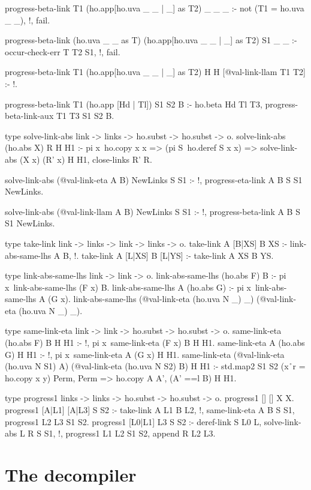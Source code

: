 \begin{elpicode}
  progress-beta-link T1 (ho.app[ho.uva _ _ | _] as T2) _ _ _ :- 
    not (T1 = ho.uva _ _), !, fail.

  progress-beta-link (ho.uva _ _ as T) (ho.app[ho.uva _ _ | _] as T2) S1 _ _ :- 
    occur-check-err T T2 S1, !, fail.

  progress-beta-link T1 (ho.app[ho.uva _ _ | _] as T2) H H [@val-link-llam T1 T2] :- !.

  progress-beta-link T1 (ho.app [Hd | Tl]) S1 S2 B :-
    ho.beta Hd Tl T3, 
    progress-beta-link-aux T1 T3 S1 S2 B.

  type solve-link-abs link -> links -> ho.subst -> ho.subst -> o.
  solve-link-abs (ho.abs X) R H H1 :- 
    pi x\ ho.copy x x => (pi S\ ho.deref S x x) => 
      solve-link-abs (X x) (R' x) H H1,
    close-links R' R.

  solve-link-abs (@val-link-eta A B) NewLinks S S1 :- !,
    progress-eta-link A B S S1 NewLinks.

  solve-link-abs (@val-link-llam A B) NewLinks S S1 :- !,
    progress-beta-link A B S S1 NewLinks.

  type take-link link -> links -> link -> links -> o.
  take-link A [B|XS] B XS :- link-abs-same-lhs A B, !.
  take-link A [L|XS] B [L|YS] :- take-link A XS B YS.

  type link-abs-same-lhs link -> link -> o.
  link-abs-same-lhs (ho.abs F) B :- 
    pi x\ link-abs-same-lhs (F x) B.
  link-abs-same-lhs A (ho.abs G) :- 
    pi x\ link-abs-same-lhs A (G x).
  link-abs-same-lhs (@val-link-eta (ho.uva N _) _) (@val-link-eta (ho.uva N _) _).

  type same-link-eta link -> link -> ho.subst -> ho.subst -> o.
  same-link-eta (ho.abs F) B H H1 :- !, pi x\ same-link-eta (F x) B H H1.
  same-link-eta A (ho.abs G) H H1 :- !, pi x\ same-link-eta A (G x) H H1.
  same-link-eta (@val-link-eta (ho.uva N S1) A)
                (@val-link-eta (ho.uva N S2) B) H H1 :-
    std.map2 S1 S2 (x\y\r\ r = ho.copy x y) Perm,
    Perm => ho.copy A A',
    (A' ==l B) H H1.

  type progress1 links -> links -> ho.subst -> ho.subst -> o.
  progress1 [] [] X X.
  progress1 [A|L1] [A|L3] S S2 :- take-link A L1 B L2, !,
    same-link-eta A B S S1, 
    progress1 L2 L3 S1 S2.
  progress1 [L0|L1] L3 S S2 :- deref-link S L0 L,
    solve-link-abs L R S S1, !,
    progress1 L1 L2 S1 S2, append R L2 L3.
\end{elpicode}

\section{The decompiler}

